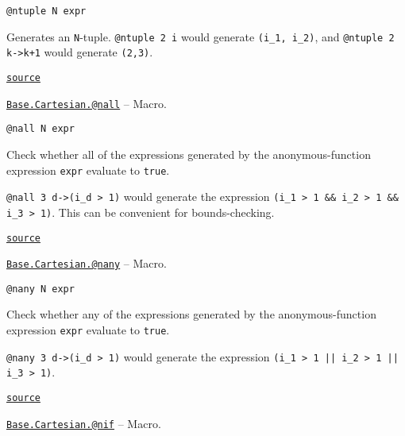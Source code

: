 \begin{adjustwidth}{2em}{0pt}


\begin{verbatim}
@ntuple N expr
\end{verbatim}

Generates an \texttt{N}-tuple. \texttt{@ntuple 2 i} would generate \texttt{(i\_1, i\_2)}, and \texttt{@ntuple 2 k->k+1} would generate \texttt{(2,3)}.



\href{https://github.com/JuliaLang/julia/blob/9058264a69f9efc1af805c4473c946f87859b731/base/cartesian.jl#L193-L198}{\texttt{source}}


\end{adjustwidth}
\hypertarget{5463798602076286002}{}
\hyperlink{5463798602076286002}{\texttt{Base.Cartesian.@nall}}  -- {Macro.}

\begin{adjustwidth}{2em}{0pt}


\begin{verbatim}
@nall N expr
\end{verbatim}

Check whether all of the expressions generated by the anonymous-function expression \texttt{expr} evaluate to \texttt{true}.

\texttt{@nall 3 d->(i\_d > 1)} would generate the expression \texttt{(i\_1 > 1 \&\& i\_2 > 1 \&\& i\_3 > 1)}. This can be convenient for bounds-checking.



\href{https://github.com/JuliaLang/julia/blob/9058264a69f9efc1af805c4473c946f87859b731/base/cartesian.jl#L160-L168}{\texttt{source}}


\end{adjustwidth}
\hypertarget{11114957141394185901}{}
\hyperlink{11114957141394185901}{\texttt{Base.Cartesian.@nany}}  -- {Macro.}

\begin{adjustwidth}{2em}{0pt}


\begin{verbatim}
@nany N expr
\end{verbatim}

Check whether any of the expressions generated by the anonymous-function expression \texttt{expr} evaluate to \texttt{true}.

\texttt{@nany 3 d->(i\_d > 1)} would generate the expression \texttt{(i\_1 > 1 || i\_2 > 1 || i\_3 > 1)}.



\href{https://github.com/JuliaLang/julia/blob/9058264a69f9efc1af805c4473c946f87859b731/base/cartesian.jl#L177-L184}{\texttt{source}}


\end{adjustwidth}
\hypertarget{2428714678347040919}{}
\hyperlink{2428714678347040919}{\texttt{Base.Cartesian.@nif}}  -- {Macro.}

